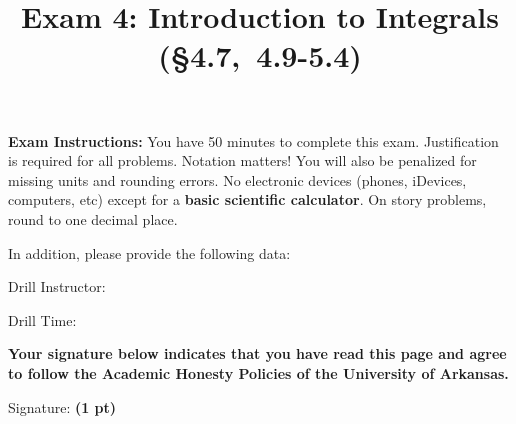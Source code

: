 \documentclass[12pt, addpoints]{exam}
\title{\vspace{-8pc}
\vfill{\Huge
	\bf Exam 4: Introduction to Integrals (\S 4.7,\ 4.9-5.4)} 
	}
\date{}
\theoremstyle{plain}
\begin{document}
\begin{coverpages}
\maketitle
\thispagestyle{headandfoot}
\vspace{-4pc}
{\bf Exam Instructions:} You have 50 minutes to complete this exam.  Justification is required for all problems.  Notation matters!  You will also be penalized for missing units and rounding errors.  No electronic devices (phones, iDevices, computers, etc) except for a \textbf{basic scientific calculator}.  On story problems, round to one decimal place. %

\begin{flushright}
In addition, please provide the following data:

\vspace{0.3in}
Drill Instructor: \underline{\hspace{40ex}}

\vspace{0.3in}
Drill Time: \underline{\hspace{40ex}}
\end{flushright}

\vfill
\textbf{Your signature below indicates that you have read this page and agree to follow the Academic Honesty Policies of the University of Arkansas.}  

\vspace{0.3in}
Signature: {\bf (1 pt)} \underline{\hspace{73ex}}

\newpage

\begin{center}
\vspace*{\fill}
\vspace*{\fill}
\end{center}
\end{coverpages}
\end{document}
